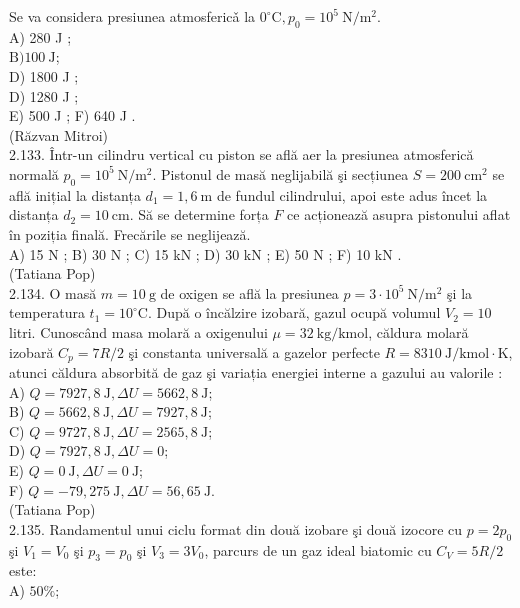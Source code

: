 \documentclass[10pt]{article}
\begin{document}
Se va considera presiunea atmosfericǎ la $0^{\circ} \mathrm{C}, p_{0}=10^{5} \mathrm{~N} / \mathrm{m}^{2}$.\\
A) 280 J ;\\
$\mathrm{B}) 100 \mathrm{~J}$;\\
D) 1800 J ;\\
D) 1280 J ;\\
E) 500 J ; F) 640 J .\\
(Răzvan Mitroi)\\
2.133. Într-un cilindru vertical cu piston se află aer la presiunea atmosferică normală $p_{0}=10^{5} \mathrm{~N} / \mathrm{m}^{2}$. Pistonul de masă neglijabilă şi secțiunea $S=200 \mathrm{~cm}^{2}$ se află inițial la distanța $d_{1}=1,6 \mathrm{~m}$ de fundul cilindrului, apoi este adus încet la distanța $d_{2}=10 \mathrm{~cm}$. Să se determine forța $F$ ce acționează asupra pistonului aflat în poziția finală. Frecările se neglijează.\\
A) 15 N ; B) 30 N ; C) 15 kN ; D) 30 kN ; E) 50 N ; F) 10 kN .\\
(Tatiana Pop)\\
2.134. O masă $m=10 \mathrm{~g}$ de oxigen se află la presiunea $p=3 \cdot 10^{5} \mathrm{~N} / \mathrm{m}^{2}$ şi la temperatura $t_{1}=10^{\circ} \mathrm{C}$. După o încălzire izobară, gazul ocupă volumul $V_{2}=10$ litri. Cunoscând masa molară a oxigenului $\mu=32 \mathrm{~kg} / \mathrm{kmol}$, căldura molară izobară $C_{p}=7 R / 2$ şi constanta universală a gazelor perfecte $R=8310 \mathrm{~J} / \mathrm{kmol} \cdot \mathrm{K}$, atunci căldura absorbită de gaz şi variația energiei interne a gazului au valorile :\\
A) $Q=7927,8 \mathrm{~J}, \Delta U=5662,8 \mathrm{~J}$;\\
B) $Q=5662,8 \mathrm{~J}, \Delta U=7927,8 \mathrm{~J}$;\\
C) $Q=9727,8 \mathrm{~J}, \Delta U=2565,8 \mathrm{~J}$;\\
D) $Q=7927,8 \mathrm{~J}, \Delta U=0$;\\
E) $Q=0 \mathrm{~J}, \Delta U=0 \mathrm{~J}$;\\
F) $Q=-79,275 \mathrm{~J}, \Delta U=56,65 \mathrm{~J}$.\\
(Tatiana Pop)\\
2.135. Randamentul unui ciclu format din două izobare şi două izocore cu $p=2 p_{0}$ şi $V_{1}=V_{0}$ şi $p_{3}=p_{0}$ şi $V_{3}=3 V_{0}$, parcurs de un gaz ideal biatomic cu $C_{V}=5 R / 2$ este:\\
A) $50 \%$;\\
\end{document}
